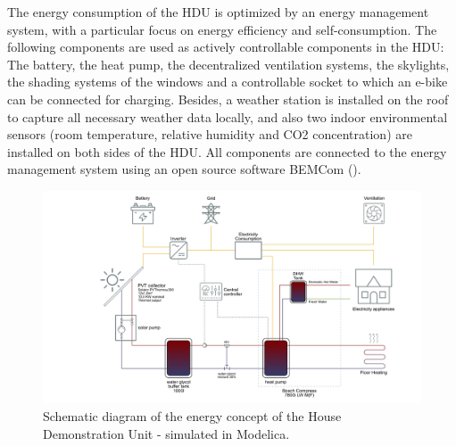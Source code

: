 \documentclass[twocolumn, a4paper,10pt]{article}
\begin{document}
The energy consumption of the HDU is optimized by an energy management system, with a particular focus on energy efficiency and self-consumption. The following components are used as actively controllable components in the HDU: The battery, the heat pump, the decentralized ventilation systems, the skylights, the shading systems of the windows and a controllable socket to which an e-bike can be connected for charging. Besides, a weather station is installed on the roof to capture all necessary weather data locally, and also two indoor environmental sensors (room temperature, relative humidity and CO2 concentration) are installed on both sides of the HDU. All components are connected to the energy management system using an open source software BEMCom (\citeyear{Woelfle2022}).

\begin{figure}[ht]
\centering
\includegraphics[trim={9cm 0 0 0},scale=0.3]{img/HDU_SimConcept.pdf}
\vspace{-5pt} 
\caption{Schematic diagram of the energy concept of the House Demonstration Unit - simulated in Modelica.}
\label{fig:HDU_SimConcept}
\end{figure}

\end{document}
